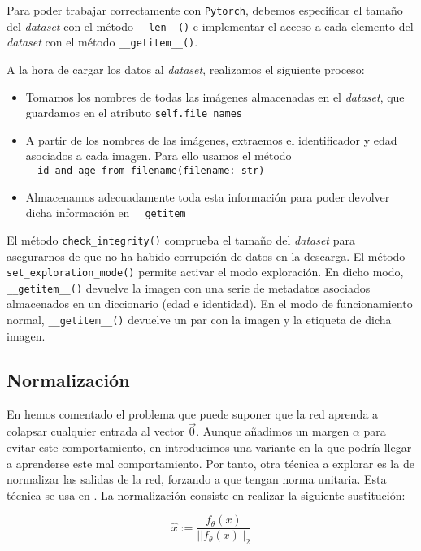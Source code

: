 Para poder trabajar correctamente con \lstinline{Pytorch}, debemos especificar el tamaño del \textit{dataset} con el método \lstinline{__len__()} e implementar el acceso a cada elemento del \textit{dataset} con el método \lstinline{__getitem__()}.

A la hora de cargar los datos al \textit{dataset}, realizamos el siguiente proceso:

\begin{itemize}
    \item Tomamos los nombres de todas las imágenes almacenadas en el \textit{dataset}, que guardamos en el atributo \lstinline{self.file_names}
    \item A partir de los nombres de las imágenes, extraemos el identificador y edad asociados a cada imagen. Para ello usamos el método \lstinline{__id_and_age_from_filename(filename: str)}
    \item Almacenamos adecuadamente toda esta información para poder devolver dicha información en \lstinline{__getitem__}
\end{itemize}

El método \lstinline{check_integrity()} comprueba el tamaño del \textit{dataset} para asegurarnos de que no ha habido corrupción de datos en la descarga. El método \lstinline{set_exploration_mode()} permite activar el modo exploración. En dicho modo, \lstinline{__getitem__()} devuelve la imagen con una serie de metadatos asociados almacenados en un diccionario (edad e identidad). En el modo de funcionamiento normal, \lstinline{__getitem__()} devuelve un par con la imagen y la etiqueta de dicha imagen.

\subsection{Normalización}

En  hemos comentado el problema que puede suponer que la red aprenda a colapsar cualquier entrada al vector $\vec{0}$. Aunque añadimos un margen $\alpha$ para evitar este comportamiento, en  introducimos una variante en la que podría llegar a aprenderse este mal comportamiento. Por tanto, otra técnica a explorar es la de normalizar las salidas de la red, forzando a que tengan norma unitaria. Esta técnica se usa en \cite{informatica:facenet}. La normalización consiste en realizar la siguiente sustitución:

\begin{equation} \label{ieq:normalizacion}
    \hat{x} := \frac{f_{\theta}(x)}{||f_{\theta}(x)||_2}
\end{equation}

